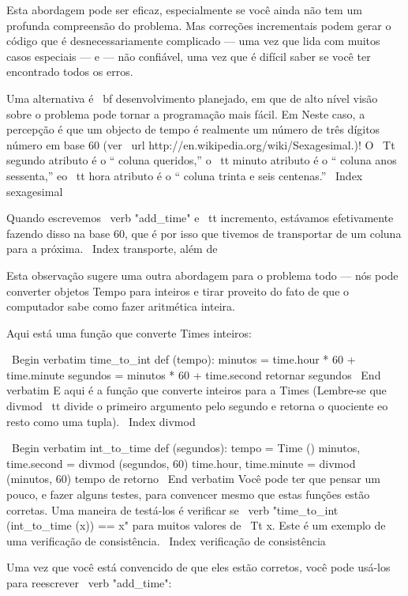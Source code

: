 \documentclass[10pt]{book}
\begin{document}
{{{{{{{{{{{{{{Esta abordagem pode ser eficaz, especialmente se você ainda não tem um
profunda compreensão do problema. Mas correções incrementais podem
gerar o código que é desnecessariamente complicado --- uma vez que lida com
muitos casos especiais --- e --- não confiável, uma vez que é difícil saber se você
ter encontrado todos os erros.

Uma alternativa é {\ bf desenvolvimento planejado}, em que de alto nível
visão sobre o problema pode tornar a programação mais fácil. Em
Neste caso, a percepção é que um objecto de tempo é realmente um número de três dígitos
número em base 60 (ver \ url {http://en.wikipedia.org/wiki/Sexagesimal}.)! O
{\ Tt} segundo atributo é o `` coluna queridos,'' o {\ tt minuto}
atributo é o `` coluna anos sessenta,'' eo {\ tt hora} atributo é
o `` coluna trinta e seis centenas.''
\ Index {sexagesimal}

Quando escrevemos \ verb "add_time" e {\ tt incremento}, estávamos efetivamente
fazendo disso na base 60, que é por isso que tivemos de transportar de um
coluna para a próxima.
\ Index {transporte, além de}

Esta observação sugere uma outra abordagem para o problema todo --- nós
pode converter objetos Tempo para inteiros e tirar proveito do fato de
que o computador sabe como fazer aritmética inteira.  

Aqui está uma função que converte Times inteiros:

\ Begin {verbatim}
time_to_int def (tempo):
    minutos = time.hour * 60 + time.minute
    segundos = minutos * 60 + time.second
    retornar segundos
\ End {verbatim}
%
E aqui é a função que converte inteiros para a Times
(Lembre-se que {divmod \ tt} divide o primeiro argumento pelo segundo
e retorna o quociente eo resto como uma tupla).
\ Index {} divmod

\ Begin {verbatim}
int_to_time def (segundos):
    tempo = Time ()
    minutos, time.second = divmod (segundos, 60)
    time.hour, time.minute = divmod (minutos, 60)
    tempo de retorno
\ End {verbatim}
%
Você pode ter que pensar um pouco, e fazer alguns testes, para convencer
mesmo que estas funções estão corretas. Uma maneira de testá-los é
verificar se \ verb "time_to_int (int_to_time (x)) == x" para muitos valores de
{\ Tt x}. Este é um exemplo de uma verificação de consistência.
\ Index {verificação de consistência}

Uma vez que você está convencido de que eles estão corretos, você pode usá-los para 
reescrever \ verb "add_time":

}}}}}}}}}}}}}}
\end{document}
